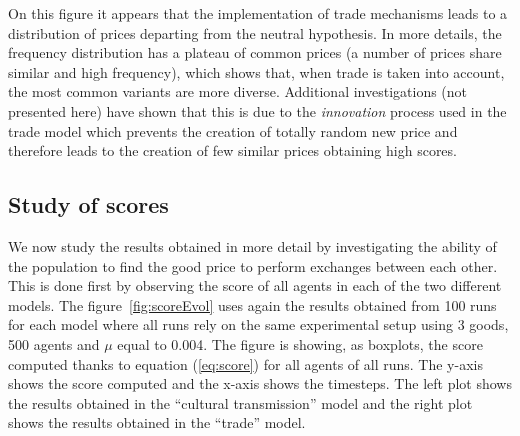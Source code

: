 \documentclass{wscpaperproc}
\begin{document}

On this figure it appears that the implementation of trade mechanisms leads to a distribution of prices departing from the neutral hypothesis. In more details, the frequency distribution has a plateau of common prices (a number of prices share similar and high frequency), which shows that, when trade is taken into account, the most common variants are more diverse. Additional investigations (not presented here) have shown that this is due to the \emph{innovation} process used in the trade model which prevents the creation of totally random new price and therefore leads to the creation of few similar prices obtaining high scores.


\subsection{Study of scores}

We now study the results obtained in more detail by investigating the ability of the population to find the good price to perform exchanges between each other. This is done first by observing the score of all agents in each of the two different models. The figure~\ref{fig:scoreEvol} uses again the results obtained from 100 runs for each model where all runs rely on the same experimental setup using 3 goods, 500 agents and $\mu$ equal to 0.004. The figure is showing, as boxplots, the score computed thanks to equation (\ref{eq:score}) for all agents of all runs. The y-axis shows the score computed and the x-axis shows the timesteps. The left plot shows the results obtained in the ``cultural transmission'' model and the right plot shows the results obtained in the ``trade'' model.
\end{document}
